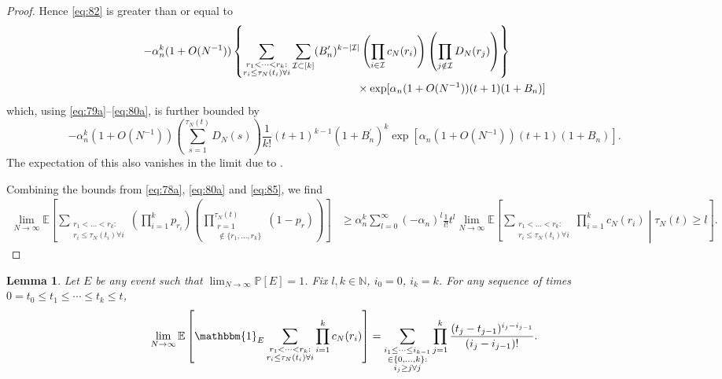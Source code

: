\documentclass{article}
\newtheorem{lemma}{Lemma}
\newcommand{\Prob}{\mathbb{P}}
\newcommand{\E}{\mathbb{E}}
\newcommand{\1}[1]{\mathbbm{1}_{#1}}
\begin{document}
\begin{proof}
Hence \eqref{eq:82} is greater than or equal to
\begin{align}
- \alpha_n^k (1 + O(N^{-1}) )
&\left\{ \sum_{\substack{r_1 <\dots< r_k :\\ r_i \leq \tau_N(t_i) \forall i}}
\sum_{\mathcal{I} \subset [k]} (B_n^\prime)^{k-|\mathcal{I}|}
\left( \prod_{i\in\mathcal{I}} c_N(r_i) \right)
\left( \prod_{j\notin\mathcal{I}} D_N(r_j) \right) \right\} \notag\\
&\hspace{4cm}\times \exp[ \alpha_n (1 + O(N^{-1}) ) (t+1) (1+B_n) ] 
\end{align}
which, using \eqref{eq:79a}--\eqref{eq:80a}, is further bounded by
\begin{equation}
- \alpha_n^k (1 + O(N^{-1}) ) \left( \sum_{s=1}^{\tau_N(t)} D_N(s) \right) \frac{1}{k!} (t+1)^{k-1} (1 + B_n^\prime)^k 
\exp[ \alpha_n (1 + O(N^{-1}) ) (t+1) (1+B_n) ] . \label{eq:85}
\end{equation}
The expectation of this also vanishes in the limit due to \citet[Equation (3.4)]{brown2021}.

Combining the bounds from \eqref{eq:78a}, \eqref{eq:80a} and \eqref{eq:85}, we find
\begin{align}
\lim_{N\to\infty} \E \left[ \sum_{\substack{r_1 <\dots< r_k :\\ r_i \leq \tau_N(t_i) \forall i}}
\left( \prod_{i=1}^k p_{r_i} \right)
\left( \prod_{\substack{r=1 \\ \notin \{r_1,\dots,r_k\} }}^{\tau_N(t)} (1-p_r) \right) \right]
&\geq \alpha_n^k \sum_{l=0}^{\infty} (-\alpha_n)^l \frac{1}{l!} t^l 
\lim_{N\to\infty}\E \left[ \sum_{\substack{r_1 <\dots< r_k :\\ r_i \leq \tau_N(t_i) \forall i}} \prod_{i=1}^k c_N(r_i) \middle| \tau_N(t) \geq l \right] .
\end{align}
\end{proof}



\begin{lemma}\label{thm:LOterms_equality}
Let $E$ be any event such that $\lim_{N\to\infty} \Prob[E] =1$. Fix $l, k \in \mathbb{N}$, $i_0=0$, $i_k=k$. For any sequence of times $0 = t_0 \leq t_1 \leq \cdots \leq t_k \leq t$,
\begin{equation}\label{eq:88}
\lim_{N\to\infty} \E \left[ \1{E} \sum_{\substack{r_1<\dots<r_k :\\ r_i\leq \tau_N(t_i) \forall i}} \prod_{i=1}^k c_N(r_i) \right] 
= \sum_{\substack{i_1\leq \dots\leq i_{k-1}\\ \in \{0,\dots,k\} :\\ i_j \geq j \forall j}} \prod_{j=1}^k \frac{(t_j - t_{j-1})^{i_j - i_{j-1}}}{(i_j - i_{j-1})! } .
\end{equation}
\end{lemma}
\end{document}
